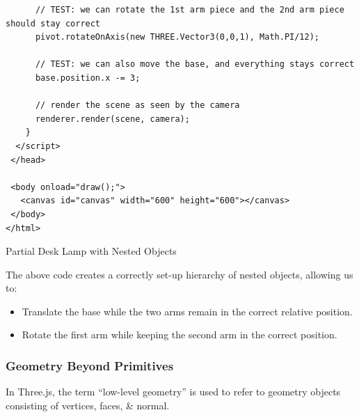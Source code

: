 \documentclass[a4paper,11pt]{article}
\newenvironment{code}{\captionsetup{type=listing}}{}
\begin{document}
\begin{code}
\begin{verbatim}
      // TEST: we can rotate the 1st arm piece and the 2nd arm piece should stay correct
      pivot.rotateOnAxis(new THREE.Vector3(0,0,1), Math.PI/12);

      // TEST: we can also move the base, and everything stays correct
      base.position.x -= 3;
      
      // render the scene as seen by the camera
      renderer.render(scene, camera);
    }
  </script>
 </head>

 <body onload="draw();">
   <canvas id="canvas" width="600" height="600"></canvas>
 </body>
</html>
\end{verbatim}
\caption{Partial Desk Lamp with Nested Objects}
\end{code}

The above code creates a correctly set-up hierarchy of nested objects, allowing us to:
\begin{itemize}
    \item   Translate the base while the two arms remain in the correct relative position.
    \item   Rotate the first arm while keeping the second arm in the correct position.
\end{itemize}

\subsubsection{Geometry Beyond Primitives}
In Three.js, the term ``low-level geometry'' is used to refer to geometry objects consisting of vertices, faces, \& 
normal.
\end{document}
